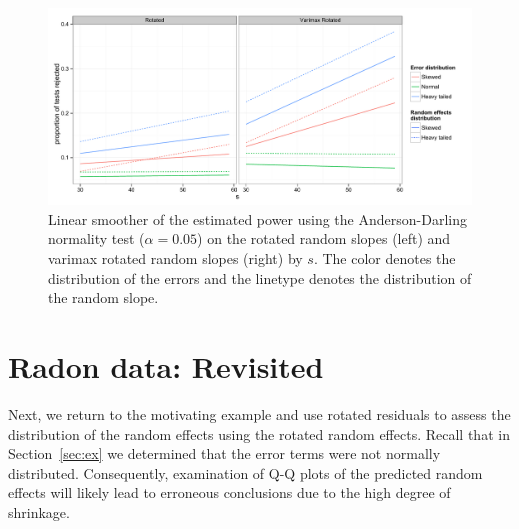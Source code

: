 \documentclass[12pt]{article} %
\begin{document}
\begin{figure}
	\centering
	\includegraphics[width=\textwidth]{ad_slope_power.pdf}
	\caption{\label{fig:power-slope}Linear smoother of the estimated power using the Anderson-Darling normality test ($\alpha = 0.05$) on the rotated random slopes (left) and varimax rotated random slopes (right) by $s$. The color denotes the distribution of the errors and the linetype denotes the distribution of the random slope.}
\end{figure}



%
%
%
%

\section{Radon data: Revisited}\label{sec:radon2}
Next, we return to the motivating example and use rotated residuals to assess the distribution of the random effects using the rotated random effects. 
Recall that in Section~\ref{sec:ex} we determined that the error terms were not normally distributed. Consequently, examination of Q-Q plots of the predicted random effects will likely lead to erroneous conclusions due to the high degree of shrinkage. 
\end{document}
